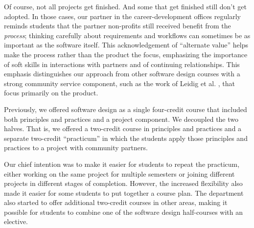 Of course, not all projects get finished.  And some that get finished
still don't get adopted.  In those cases, our partner in the
career-development offices regularly reminds students that the
partner non-profits still received benefit from the \textit{process};
thinking carefully about requirements and workflows can
sometimes be as important as the software itself.  This 
acknowledgement of ``alternate value'' helps make the process
rather than the product the focus, emphasizing the importance of
soft skills in interactions with partners and of continuing
relationships. This emphasis distinguishes
our approach from other software design courses with a strong
community service component, such as the work of Leidig et al.
\cite{leidig-2006,lange-2011}, that focus primarily on the product.

Previously, we offered software design as a single
four-credit course that included both principles and practices
and a project component.  We decoupled the two halves.  That is,
we offered a two-credit course in principles and practices and a
separate two-credit ``practicum'' in which the students apply those
principles and practices to a project with community partners.

Our chief intention was to make it easier for students to repeat
the practicum, either working on the same project for multiple semesters
or joining different projects in different stages of completion.
However, the increased flexibility also made it easier for some students
to put together a course plan. 
The department also started to offer additional two-credit
courses in other areas, making it possible for students to combine
one of the software design half-courses with an elective.

